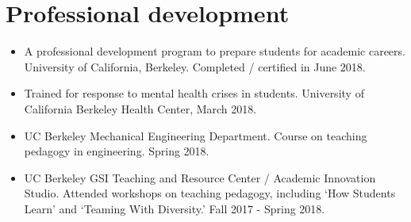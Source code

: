 \documentclass[letterpaper]{deedy-resume} %
\begin{document}
{%



  
  



\vspace{0.2cm}
\section{Professional development}
\vspace{0.2cm}

\begin{itemize}

\item {} A professional development program to prepare students for academic careers. University of California, Berkeley. Completed / certified in June 2018.
  
\item {} Trained for response to mental health crises in students. University of California Berkeley Health Center, March 2018.

\item {} UC Berkeley Mechanical Engineering Department. Course on teaching pedagogy in engineering. Spring 2018.
  
\item {} UC Berkeley GSI Teaching and Resource Center / Academic Innovation Studio. Attended workshops on teaching pedagogy, including `How Students Learn' and `Teaming With Diversity.' Fall 2017 - Spring 2018.


\end{itemize}}
\end{document}
